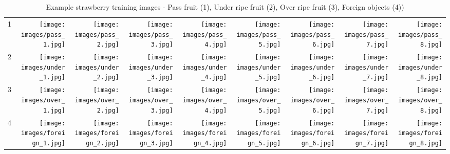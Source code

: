 \documentclass[conference]{IEEEtran}
\begin{document}
\begin{table*}\sffamily
	\caption{Example strawberry training images - Pass fruit (1), Under ripe fruit (2), Over ripe fruit (3), Foreign objects (4))}
	\label{tab:examples}
	\begin{tabular}{l*8{N}@{}}
		\toprule
		
		1 &
		\texttt{[image: images/pass\_1.jpg]} & \texttt{[image: images/pass\_2.jpg]} & \texttt{[image: images/pass\_3.jpg]} &         \texttt{[image: images/pass\_4.jpg]} & \texttt{[image: images/pass\_5.jpg]} &         \texttt{[image: images/pass\_6.jpg]} & \texttt{[image: images/pass\_7.jpg]} &         \texttt{[image: images/pass\_8.jpg]} \\
		
		2 &
		\texttt{[image: images/under\_1.jpg]} & \texttt{[image: images/under\_2.jpg]} & \texttt{[image: images/under\_3.jpg]} &         \texttt{[image: images/under\_4.jpg]} & \texttt{[image: images/under\_5.jpg]} &         \texttt{[image: images/under\_6.jpg]} & \texttt{[image: images/under\_7.jpg]} &         \texttt{[image: images/under\_8.jpg]} \\
		
		3 &
		\texttt{[image: images/over\_1.jpg]} & \texttt{[image: images/over\_2.jpg]} & \texttt{[image: images/over\_3.jpg]} &         \texttt{[image: images/over\_4.jpg]} & \texttt{[image: images/over\_5.jpg]} &         \texttt{[image: images/over\_6.jpg]} & \texttt{[image: images/over\_7.jpg]} &         \texttt{[image: images/over\_8.jpg]} \\
		
		4 &
		\texttt{[image: images/foreign\_1.jpg]} & \texttt{[image: images/foreign\_2.jpg]} & \texttt{[image: images/foreign\_3.jpg]} &         \texttt{[image: images/foreign\_4.jpg]} & \texttt{[image: images/foreign\_5.jpg]} &         \texttt{[image: images/foreign\_6.jpg]} & \texttt{[image: images/foreign\_7.jpg]} &         \texttt{[image: images/foreign\_8.jpg]} \\
		
		
		\bottomrule
	\end{tabular}
\end{table*} 
\end{document}
